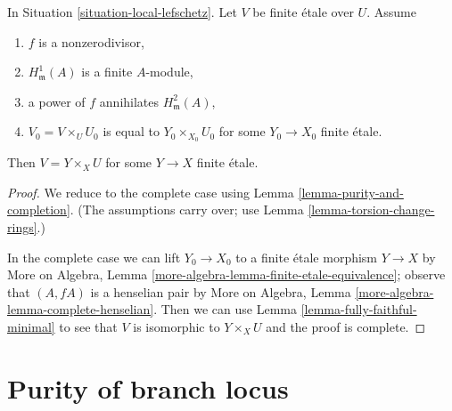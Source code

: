 \begin{lemma}
\label{lemma-lift-purity-general}
In Situation \ref{situation-local-lefschetz}.
Let $V$ be finite \'etale over $U$. Assume
\begin{enumerate}
\item $f$ is a nonzerodivisor,
\item $H^1_\mathfrak m(A)$ is a finite $A$-module,
\item a power of $f$ annihilates $H^2_\mathfrak m(A)$,
\item $V_0 = V \times_U U_0$ is equal to $Y_0 \times_{X_0} U_0$
for some $Y_0 \to X_0$ finite \'etale.
\end{enumerate}
Then $V = Y \times_X U$ for some $Y \to X$ finite \'etale.
\end{lemma}

\begin{proof}
We reduce to the complete case using Lemma \ref{lemma-purity-and-completion}.
(The assumptions carry over; use Lemma \ref{lemma-torsion-change-rings}.)

\medskip\noindent
In the complete case we can lift $Y_0 \to X_0$ to a finite \'etale
morphism $Y \to X$ by
More on Algebra, Lemma \ref{more-algebra-lemma-finite-etale-equivalence};
observe that $(A, fA)$ is a henselian pair by
More on Algebra, Lemma \ref{more-algebra-lemma-complete-henselian}.
Then we can use Lemma \ref{lemma-fully-faithful-minimal}
to see that $V$ is isomorphic to $Y \times_X U$ and
the proof is complete.
\end{proof}










\section{Purity of branch locus}
\label{section-purity}

